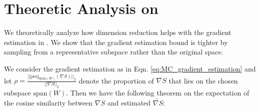 \section{Theoretic Analysis on \name}
\label{sec:dimred-theory}

We theoretically analyze how dimension reduction helps with the gradient estimation in \name. We show that the gradient estimation bound is tighter by sampling from a representative subspace rather than the original space.

We consider the gradient estimation as in Eqn. \ref{eq:MC_gradient_estimation} and let $\rho = \frac{||\text{proj}_{\text{span}(W)}(\nabla S)||_2}{||\nabla S||_2}$ denote the proportion of $\nabla S$ that lies on the chosen subspace $\text{span}(W)$. Then we have the following theorem on the expectation of the cosine similarity between $\nabla S$ and estimated $\widetilde{\nabla S}$:

